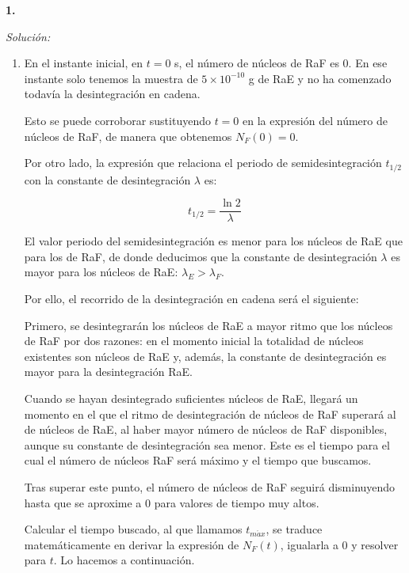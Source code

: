 \textbf{1.}


\vspace{20px}
\textit{Solución:}
\\

\begin{enumerate}
[label=\alph*)]
    \item En el instante inicial, en $t = 0$ s, el número de núcleos de RaF es 0. En ese instante solo tenemos la muestra de $5 \times 10^{-10}$ g de RaE y no
    ha comenzado todavía la desintegración en cadena.

    Esto se puede corroborar sustituyendo $t = 0$ en la expresión del número de núcleos de RaF, de manera que obtenemos $N_F(0) = 0$.

    Por otro lado, la expresión que relaciona el periodo de semidesintegración $t_{1/2}$ con la constante de desintegración $\lambda$ es:

    \begin{equation*}
        t_{1/2} = \frac{\ln 2}{\lambda}
    \end{equation*}

    El valor periodo del semidesintegración es menor para los núcleos de RaE que para los de RaF, de donde deducimos que la constante de desintegración
    $\lambda$ es mayor para los núcleos de RaE:
    $\lambda_{E} > \lambda_{F}$.

    Por ello, el recorrido de la desintegración en cadena será el siguiente:

    Primero, se desintegrarán los núcleos de RaE a mayor ritmo que los núcleos de RaF por dos razones: en el momento inicial la totalidad de núcleos existentes son
    núcleos de RaE y, además, la constante de desintegración es mayor para la desintegración RaE.

    Cuando se hayan desintegrado suficientes núcleos de RaE, llegará un momento en el que el ritmo de desintegración de núcleos de RaF superará al de núcleos de RaE, al haber mayor número de
    núcleos de RaF disponibles, aunque su constante de desintegración sea menor. Este es el tiempo para el cual el número de núcleos RaF será máximo y el tiempo que
    buscamos.

    Tras superar este punto, el número de núcleos de RaF seguirá disminuyendo hasta que se aproxime a 0 para valores de tiempo muy altos.

    Calcular el tiempo buscado, al que llamamos $t_{m\acute{a}x}$,
    se traduce matemáticamente en derivar la expresión de $N_F (t)$, igualarla a 0 y resolver para $t$. Lo hacemos a continuación.


\end{enumerate}
